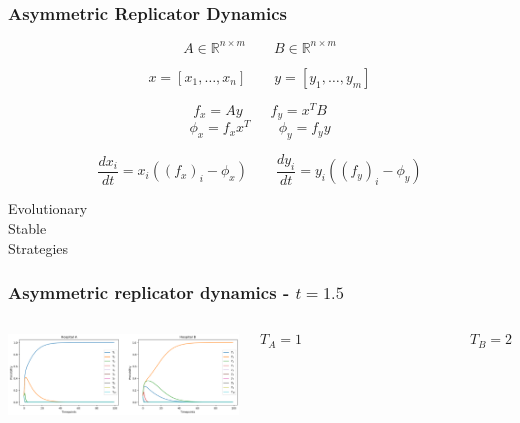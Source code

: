 \begin{frame}
    \frametitle{Asymmetric Replicator Dynamics}
    \centering

    \[
        A \in \mathbb{R}^{n \times m} \qquad
        B \in \mathbb{R}^{n \times m}
    \]

    \[
        x = [x_1, \dots, x_n] \qquad y = [y_1, \dots, y_m]  
    \]

    \[
        f_x = A y \qquad f_y = x^T B
    \]
    \vspace{-0.8cm}
    \[  
        \phi_x = f_x x^T \qquad \phi_y = f_y y
    \]

    \[
        \frac{dx_i}{dt} = x_i((f_x)_i - \phi_x) \qquad
        \frac{dy_i}{dt} = y_i((f_y)_i - \phi_y)
    \]
\end{frame}


\begin{frame}
    \centering
    \Huge
    Evolutionary \\ Stable \\ Strategies
\end{frame}



\begin{frame}
    \frametitle{Asymmetric replicator dynamics - \(t = 1.5\)}
    \begin{columns}
        \centering
        \column{\dimexpr\paperwidth-10pt}
        \includegraphics[width=\textwidth]{Bin/replicator_dynamics/ard_t_1.5.png}

        \[T_A = 1  \qquad \qquad \qquad \qquad \qquad \qquad T_B = 2\]
    \end{columns}

\end{frame}



